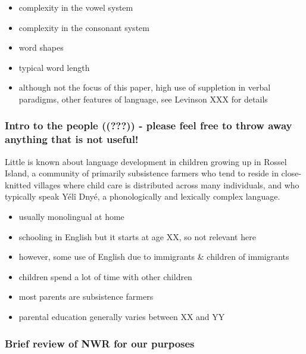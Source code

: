 \documentclass[english,,man,floatsintext]{apa6}
\providecommand{\tightlist}{%
  \setlength{\itemsep}{0pt}\setlength{\parskip}{0pt}}
\begin{document}
\begin{itemize}
\tightlist
\item
  complexity in the vowel system
\item
  complexity in the consonant system
\item
  word shapes
\item
  typical word length
\item
  although not the focus of this paper, high use of suppletion in verbal paradigms, other features of language, see Levinson XXX for details
\end{itemize}

\hypertarget{intro-to-the-people-mc---please-feel-free-to-throw-away-anything-that-is-not-useful}{%
\subsubsection{\texorpdfstring{Intro to the people (({\textbf{???}})) - please feel free to throw away anything that is not useful!}{Intro to the people ((???)) - please feel free to throw away anything that is not useful!}}\label{intro-to-the-people-mc---please-feel-free-to-throw-away-anything-that-is-not-useful}}

Little is known about language development in children growing up in Rossel Island, a community of primarily subsistence farmers who tend to reside in close-knitted villages where child care is distributed across many individuals, and who typically speak Yélî Dnyé, a phonologically and lexically complex language.

\begin{itemize}
\tightlist
\item
  usually monolingual at home
\item
  schooling in English but it starts at age XX, so not relevant here
\item
  however, some use of English due to immigrants \& children of immigrants
\item
  children spend a lot of time with other children
\item
  most parents are subsistence farmers
\item
  parental education generally varies between XX and YY
\end{itemize}

\hypertarget{brief-review-of-nwr-for-our-purposes}{%
\subsubsection{Brief review of NWR for our purposes}\label{brief-review-of-nwr-for-our-purposes}}
\end{document}
